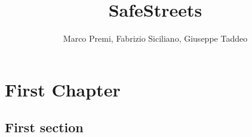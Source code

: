 \documentclass[12pt, letterpaper, twoside]{book}
\title{SafeStreets}
\author{Marco Premi, Fabrizio Siciliano, Giuseppe Taddeo}
\begin{document}
\maketitle

\chapter{First Chapter}
\section{First section}
\end{document}
